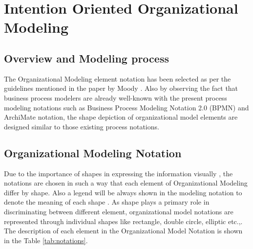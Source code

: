 \chapter{Intention Oriented Organizational Modeling}
\label{chap:orgModeling}

\section{Overview and Modeling process}
\hspace{4ex} The Organizational Modeling element notation has been selected as per the guidelines mentioned in the paper by Moody \cite{Moody2009}. Also by observing  the fact that business process modelers are already well-known with the present process modeling notations such as Business Process Modeling Notation 2.0 (BPMN) \cite{bpm2011} and ArchiMate notation\cite{arc2013}, the shape depiction of organizational model elements are designed similar to those existing process notations. 





\section{Organizational Modeling Notation}
\hspace{4ex} Due to the importance of shapes in expressing the information visually , the notations are chosen in such a way that each element of Organizational Modeling  differ by shape. Also a legend will be always shown in the modeling notation to denote the meaning of each shape \cite{Moody2009}. As shape plays a primary role in discriminating between different element, organizational model notations are represented through individual shapes like rectangle, double circle, elliptic etc.,. The description of each element in the Organizational Model Notation is shown in the Table \ref{tab:notations}. 

